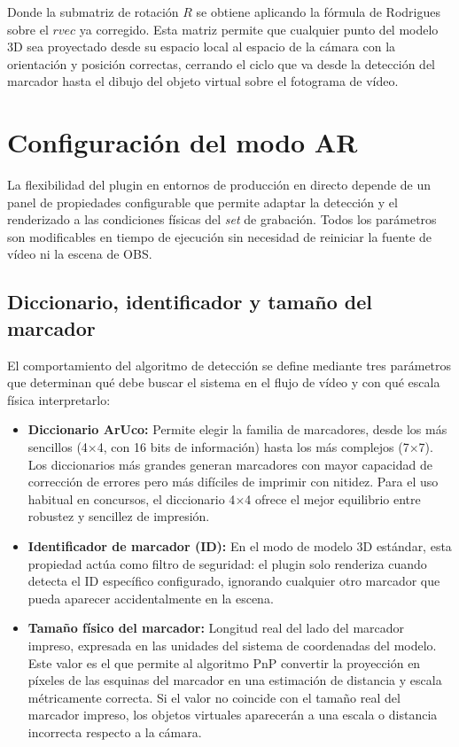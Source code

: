 Donde la submatriz de rotación $R$ se obtiene aplicando la fórmula de Rodrigues sobre el $rvec$ ya corregido. Esta matriz permite que cualquier punto del modelo 3D sea proyectado desde su espacio local al espacio de la cámara con la orientación y posición correctas, cerrando el ciclo que va desde la detección del marcador hasta el dibujo del objeto virtual sobre el fotograma de vídeo.


\section{Configuración del modo AR}
\label{sec:config_ar}

La flexibilidad del plugin en entornos de producción en directo depende de un panel de
propiedades configurable que permite adaptar la detección y el renderizado a las condiciones
físicas del \textit{set} de grabación. Todos los parámetros son modificables en tiempo de ejecución sin
necesidad de reiniciar la fuente de vídeo ni la escena de OBS.


\subsection{Diccionario, identificador y tamaño del marcador}
\label{subsec:config_detector}

El comportamiento del algoritmo de detección se define mediante tres parámetros que determinan
qué debe buscar el sistema en el flujo de vídeo y con qué escala física interpretarlo:

\begin{itemize}
    \item \textbf{Diccionario ArUco:} Permite elegir la familia de marcadores, desde los más
    sencillos (4$\times$4, con 16 bits de información) hasta los más complejos (7$\times$7).
    Los diccionarios más grandes generan marcadores con mayor capacidad de corrección de errores
    pero más difíciles de imprimir con nitidez. Para el uso habitual en concursos, el diccionario
    4$\times$4 ofrece el mejor equilibrio entre robustez y sencillez de impresión.
    \item \textbf{Identificador de marcador (ID):} En el modo de modelo 3D estándar, esta
    propiedad actúa como filtro de seguridad: el plugin solo renderiza cuando detecta el ID
    específico configurado, ignorando cualquier otro marcador que pueda aparecer accidentalmente
    en la escena.
    \item \textbf{Tamaño físico del marcador:} Longitud real del lado del marcador impreso,
    expresada en las unidades del sistema de coordenadas del modelo. Este valor es el que permite
    al algoritmo PnP convertir la proyección en píxeles de las esquinas del marcador en una
    estimación de distancia y escala métricamente correcta. Si el valor no coincide con el
    tamaño real del marcador impreso, los objetos virtuales aparecerán a una escala o distancia
    incorrecta respecto a la cámara.
\end{itemize}


